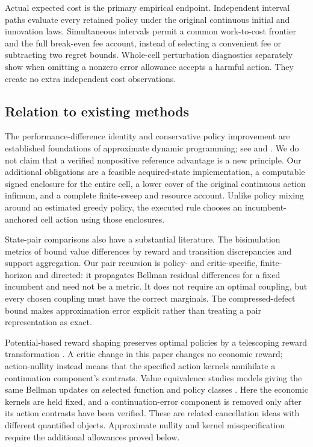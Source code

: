 \documentclass[ecta,nameyear,draft]{econsocart}
\begin{document}
Actual expected cost is the primary empirical endpoint. Independent interval paths evaluate every retained policy under the original continuous initial and innovation laws. Simultaneous intervals permit a common work-to-cost frontier and the full break-even fee account, instead of selecting a convenient fee or subtracting two regret bounds. Whole-cell perturbation diagnostics separately show when omitting a nonzero error allowance accepts a harmful action. They create no extra independent cost observations.

\subsection{Relation to existing methods}
The performance-difference identity and conservative policy improvement are established foundations of approximate dynamic programming; see \citet{kakade2002} and \citet{metelli2021}. We do not claim that a verified nonpositive reference advantage is a new principle. Our additional obligations are a feasible acquired-state implementation, a computable signed enclosure for the entire cell, a lower cover of the original continuous action infimum, and a complete finite-sweep and resource account. Unlike policy mixing around an estimated greedy policy, the executed rule chooses an incumbent-anchored cell action using those enclosures.

State-pair comparisons also have a substantial literature. The bisimulation metrics of \citet{ferns2004} bound value differences by reward and transition discrepancies and support aggregation. Our pair recursion is policy- and critic-specific, finite-horizon and directed: it propagates Bellman residual differences for a fixed incumbent and need not be a metric. It does not require an optimal coupling, but every chosen coupling must have the correct marginals. The compressed-defect bound makes approximation error explicit rather than treating a pair representation as exact.

Potential-based reward shaping preserves optimal policies by a telescoping reward transformation \citep{ng1999}. A critic change in this paper changes no economic reward; action-nullity instead means that the specified action kernels annihilate a continuation component's contrasts. Value equivalence studies models giving the same Bellman updates on selected function and policy classes \citep{grimm2020}. Here the economic kernels are held fixed, and a continuation-error component is removed only after its action contrasts have been verified. These are related cancellation ideas with different quantified objects. Approximate nullity and kernel misspecification require the additional allowances proved below.
\end{document}
